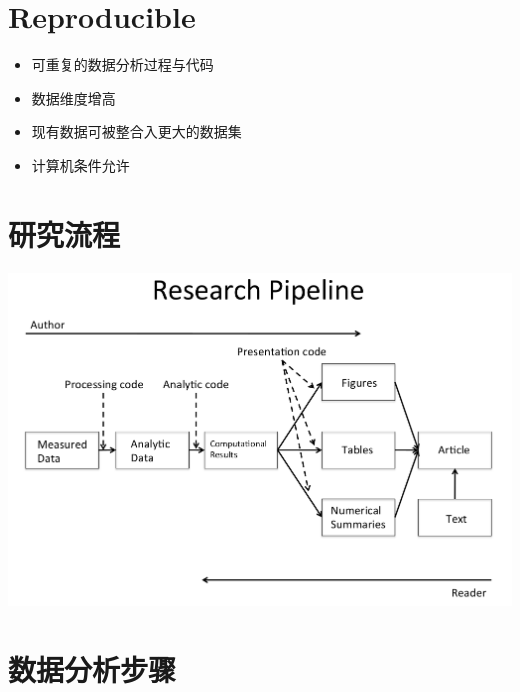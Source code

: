 \documentclass[]{book}
\providecommand{\tightlist}{%
  \setlength{\itemsep}{0pt}\setlength{\parskip}{0pt}}
\begin{document}
\hypertarget{reproducible}{%
\section{Reproducible}\label{reproducible}}

\begin{itemize}
\tightlist
\item
  可重复的数据分析过程与代码
\item
  数据维度增高
\item
  现有数据可被整合入更大的数据集
\item
  计算机条件允许
\end{itemize}

\hypertarget{ux7814ux7a76ux6d41ux7a0b}{%
\section{研究流程}\label{ux7814ux7a76ux6d41ux7a0b}}

\includegraphics[width=14.1in]{images/researchpipeline}

\hypertarget{ux6570ux636eux5206ux6790ux6b65ux9aa4}{%
\section{数据分析步骤}\label{ux6570ux636eux5206ux6790ux6b65ux9aa4}}
\end{document}
